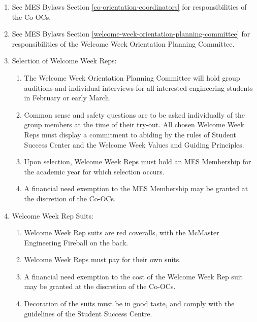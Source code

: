 \begin{enumerate}
 \item
  See MES Bylaws Section \ref{co-orientation-coordinators} for responsibilities of the Co-OCs.
 \item
  See MES Bylaws Section \ref{welcome-week-orientation-planning-committee} for responsibilities of the Welcome Week Orientation Planning Committee.
 \item
  Selection of Welcome Week Reps:

  \begin{enumerate}
   \item
    The Welcome Week Orientation Planning Committee will hold group auditions and individual interviews for all interested engineering students in February or early March.
   \item
    Common sense and safety questions are to be asked individually of the group members at the time of their try-out. All chosen Welcome Week Reps must display a commitment to abiding by the rules of Student Success Center and the Welcome Week Values and Guiding Principles.
   \item
    Upon selection, Welcome Week Reps must hold an MES Membership for the academic year for which selection occurs.
   \item
    A financial need exemption to the MES Membership may be granted at the discretion of the Co-OCs.
  \end{enumerate}
 \item
  Welcome Week Rep Suits:

  \begin{enumerate}
   \item
    Welcome Week Rep suits are red coveralls, with the McMaster Engineering Fireball on the back.
   \item
    Welcome Week Reps must pay for their own suits.
   \item
    A financial need exemption to the cost of the Welcome Week Rep suit may be granted at the discretion of the Co-OCs.
   \item
    Decoration of the suits must be in good taste, and comply with the guidelines of the Student Success Centre.

  \end{enumerate}
\end{enumerate}

